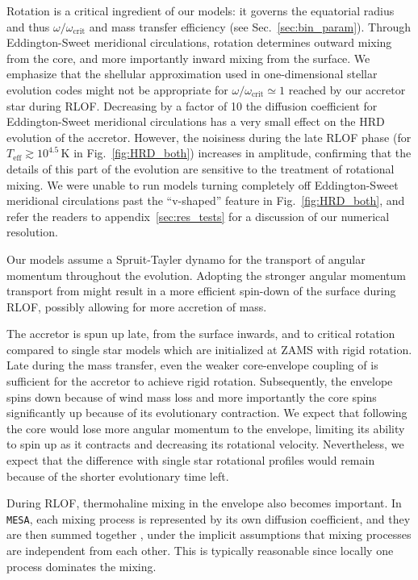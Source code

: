 \documentclass[twocolumn,twocolappendix,trackchanges]{aastex63}
\newcommand{\code}[1]{\texttt{#1}}
\newcommand{\MESA}{\code{MESA}}
\DeclareRobustCommand{\Figref}[1]{Fig.~\ref{#1}}
\DeclareRobustCommand{\Secref}[1]{Sec.~\ref{#1}}
\begin{document}
Rotation is a critical ingredient of our models: it governs the
equatorial radius and thus $\omega/\omega_\mathrm{crit}$
and mass transfer efficiency (see \Secref{sec:bin_param}). Through
Eddington-Sweet meridional circulations, rotation determines outward mixing
from the core, and more importantly inward mixing from the surface.
We emphasize that the shellular approximation used in one-dimensional
stellar evolution codes might not be appropriate for
$\omega/\omega_\mathrm{crit}\simeq 1$ reached by our accretor star
during RLOF. Decreasing by a factor of 10 the diffusion coefficient
for Eddington-Sweet meridional circulations has a very small effect on
the HRD evolution of the accretor. However, the noisiness during the
late RLOF phase (for $T_\mathrm{eff}\gtrsim10^{4.5}$\,K in
\Figref{fig:HRD_both}) increases in amplitude, confirming
that the details of this part of the evolution are sensitive to the
treatment of rotational mixing. We were unable to run models turning
completely off Eddington-Sweet meridional circulations past the
``v-shaped'' feature in \Figref{fig:HRD_both}, and refer the readers
to appendix~\ref{sec:res_tests} for a discussion of our numerical resolution.

Our models assume a Spruit-Tayler dynamo \citep{spruit:02} for the
transport of angular momentum throughout the evolution. Adopting the
stronger angular momentum transport from \cite{fuller:19} might result
in a more efficient spin-down of the surface during RLOF, possibly
allowing for more accretion of mass.

The accretor is spun up late, from the surface inwards, and to
critical rotation compared to single star models which are initialized
at ZAMS with rigid rotation. Late during the mass transfer, even the
weaker core-envelope coupling of \cite{spruit:02} is sufficient for
the accretor to achieve rigid rotation. Subsequently, the envelope
spins down because of wind mass loss and more importantly the core
spins significantly up because of its evolutionary contraction. We
expect that following \cite{fuller:19} the core would lose more
angular momentum to the envelope, limiting its ability to spin up as
it contracts and decreasing its rotational velocity.
Nevertheless, we expect that the difference with single star
rotational profiles would remain because of the shorter evolutionary time left.

During RLOF, thermohaline mixing in the envelope also becomes
important. In \MESA, each mixing process is represented by its own
diffusion coefficient, and they are then summed together
\citep[e.g.,][]{paxton:11}, under the implicit assumptions that mixing
processes are independent from each other. This is typically
reasonable since locally one process dominates the mixing.
\end{document}
